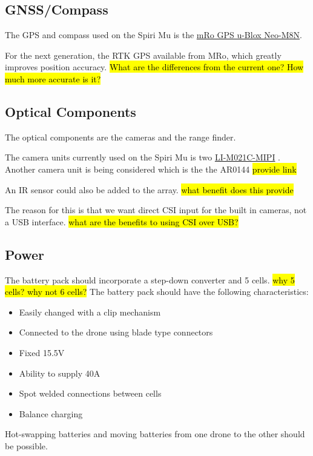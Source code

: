 \subsection{GNSS/Compass}
The GPS and compass used on the Spiri Mu is the \href{https://store.mrobotics.io/mRo-GPS-u-Blox-Neo-M8N-Dual-Compass-LIS3MDL-IST831-p/mro-gps003-mr.htm}{mRo GPS u-Blox Neo-M8N}. 

For the next generation, the RTK GPS available from MRo, which greatly improves position accuracy. \hl{What are the differences from the current one? How much more accurate is it?}

\subsection{Optical Components}
The optical components are the cameras and the range finder.

The camera units currently used on the Spiri Mu is two \href{https://leopardimaging.com/product/cmos-sensor-modules/mipi-camera-modules/li-m021c-mipi/}{LI-M021C-MIPI} . Another camera unit is being considered which is the the AR0144 \hl{provide link}

An IR sensor could also be added to the array. \hl{what benefit does this provide}

The reason for this is that we want direct CSI input for the built in cameras, not a USB interface. \hl{what are the benefits to using CSI over USB?}

\subsection{Power}
The battery pack should incorporate a step-down converter and 5 cells. \hl{why 5 cells? why not 6 cells?}
\noindent
The battery pack should have the following characteristics:
\begin{itemize}
	\setlength{\itemsep}{0pt}%
	\setlength{\parskip}{-6pt}%
	\item Easily changed with a clip mechanism
	\item Connected to the drone using blade type connectors
	\item Fixed 15.5V
	\item Ability to supply 40A
	\item Spot welded connections between cells
	\item Balance charging
\end{itemize}

Hot-swapping batteries and moving batteries from one drone to the other should be possible.

